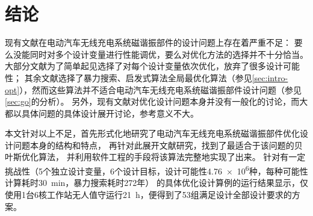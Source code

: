 \documentclass[index]{subfiles}
\begin{document}
\chapter{结论}\label{sec:con}
现有文献在电动汽车无线充电系统磁谐振部件的设计问题上存在着严重不足：
要么没能同时对多个设计变量进行性能调优，要么对优化方法的选择并不十分恰当。
大部分文献为了简单起见选择了对每个设计变量依次优化，放弃了很多设计可能性；
其余文献选择了暴力搜索、启发式算法全局最优化算法（参见\cref{sec:intro-opt}），然而这些算法并不适合电动汽车无线充电系统磁谐振部件设计问题（参见\cref{sec:go}的分析）。
另外，现有文献对优化设计问题本身并没有一般化的讨论，而大都以具体问题的具体设计展开讨论，参考意义不大。

本文针对以上不足，首先形式化地研究了电动汽车无线充电系统磁谐振部件优化设计问题本身的结构和特点，
再针对此展开文献研究，找到了最适合于该问题的贝叶斯优化算法，
并利用软件工程的手段将该算法完整地实现了出来。
针对有一定挑战性（5个独立设计变量，6个设计目标，设计可能性\num{4.76e6}种，每种可能性计算耗时\SI{30}{\minute}，暴力搜索耗时\num{272}年）
的具体优化设计算例的运行结果显示，仅使用1台6核工作站无人值守运行\SI{21}{\hour}，便得到了53组满足设计全部设计要求的方案。
\end{document}

